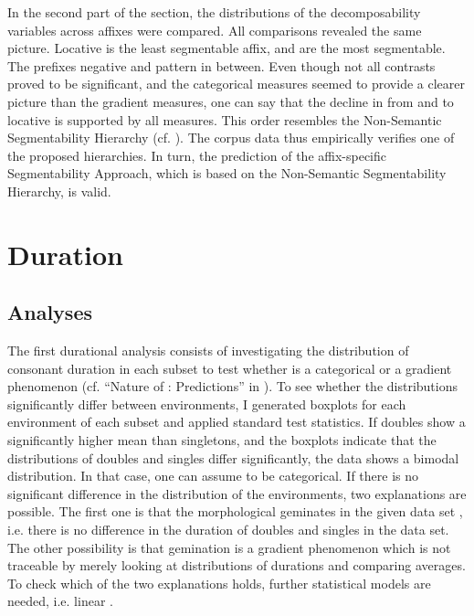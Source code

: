  In the second part of the section, the distributions of the decomposability variables across affixes were compared. All comparisons revealed the same picture. Locative  is the least segmentable affix,  and  are the most segmentable. The prefixes negative  and  pattern in between. 
 Even though not all contrasts proved to be significant, and the categorical measures seemed to provide a clearer picture than the gradient measures, one can say that the decline in  from  and  to locative  is supported by all measures. 
 This order resembles the Non-Semantic Segmentability Hierarchy (cf.  ). The corpus data thus empirically verifies one of the proposed  hierarchies. In turn, the  prediction of the affix-specific Segmentability Approach, which is based on the Non-Semantic Segmentability Hierarchy, is valid. 

\section{Duration}


\subsection{Analyses} \label{analyses dur corpus}


The first durational analysis consists of investigating the distribution of consonant duration in each subset to test whether  is a categorical or a gradient phenomenon (cf. ``Nature of : Predictions'' in ). To see whether the distributions significantly differ between environments, I generated boxplots for each environment of each subset and applied standard test statistics. 
If doubles show a significantly higher mean than singletons, and the boxplots indicate that the distributions of doubles and singles differ significantly, the data shows a bimodal distribution. In that case, one can assume  to be categorical. 
If there is no significant difference in the distribution of the environments, two explanations are possible. The first one is that the morphological geminates in the given data set , i.e. there is no difference in the duration of doubles and singles in the data set. The other possibility is that {gemination} is a gradient phenomenon which is not traceable by merely looking at distributions of durations and comparing averages. To check which of the two explanations holds, further statistical models are needed, i.e. linear . 



